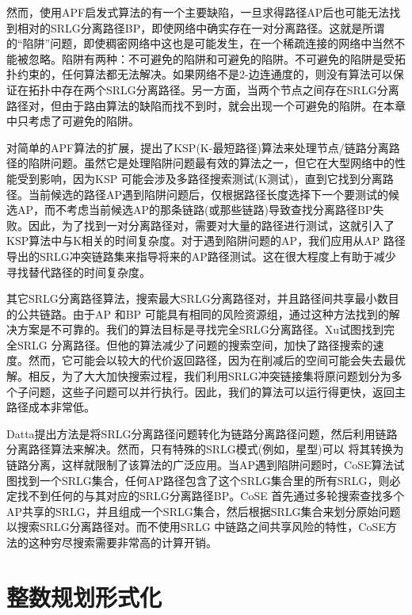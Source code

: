 然而，使用APF启发式算法的有一个主要缺陷，一旦求得路径AP后也可能无法找到相对的SRLG分离路径BP，即使网络中确实存在一对分离路径。这就是所谓的“陷阱”问题，即使稠密网络中\cite{laborczi2001solving}这也是可能发生，在一个稀疏连接的网络中当然不能被忽略。陷阱有两种：不可避免的陷阱和可避免的陷阱。不可避免的陷阱是受拓扑约束的，任何算法都无法解决。如果网络不是2-边连通度的，则没有算法可以保证在拓扑中存在两个SRLG分离路径。另一方面，当两个节点之间存在SRLG分离路径对，但由于路由算法的缺陷而找不到时，就会出现一个可避免的陷阱。在本章中只考虑了可避免的陷阱。

对简单的APF算法的扩展，提出了KSP(K-最短路径)算法来处理节点/链路分离路径的陷阱问题。虽然它是处理陷阱问题最有效的算法之一，但它在大型网络中的性能受到影响，因为KSP 可能会涉及多路径搜索测试(K测试)，直到它找到分离路径。当前候选的路径AP遇到陷阱问题后，仅根据路径长度选择下一个要测试的候选AP，而不考虑当前候选AP的那条链路(或那些链路)导致查找分离路径BP失败。因此，为了找到一对分离路径对，需要对大量的路径进行测试，这就引入了KSP算法中与K相关的时间复杂度。对于遇到陷阱问题的AP，我们应用从AP 路径导出的SRLG冲突链路集来指导将来的AP路径测试。这在很大程度上有助于减少寻找替代路径的时间复杂度。

其它SRLG分离路径算法\cite{rostami2012msdp,rostami2007cose,datta2008graph,xu2003new,todimala2004imsh}，搜索最大SRLG分离路径对，并且路径间共享最小数目的公共链路。由于AP 和BP 可能具有相同的风险资源组，通过这种方法找到的解决方案是不可靠的。我们的算法目标是寻找完全SRLG分离路径。Xu\cite{xu2003trap}试图找到完全SRLG 分离路径。但他的算法减少了问题的搜索空间，加快了路径搜索的速度。然而，它可能会以较大的代价返回路径，因为在削减后的空间可能会失去最优解。相反，为了大大加快搜索过程，我们利用SRLG冲突链接集将原问题划分为多个子问题，这些子问题可以并行执行。因此，我们的算法可以运行得更快，返回主路径成本非常低。

Datta\cite{datta2008graph}提出方法是将SRLG分离路径问题转化为链路分离路径问题，然后利用链路分离路径算法来解决。然而，只有特殊的SRLG模式(例如，星型)可以
将其转换为链路分离，这样就限制了该算法的广泛应用。当AP遇到陷阱问题时，CoSE\cite{rostami2007cose}算法试图找到一个SRLG集合，任何AP路径包含了这个SRLG集合里的所有SRLG，则必定找不到任何的与其对应的SRLG分离路径BP。CoSE 首先通过多轮搜索查找多个AP共享的SRLG，并且组成一个SRLG集合，然后根据SRLG集合来划分原始问题以搜索SRLG分离路径对。而不使用SRLG 中链路之间共享风险的特性，CoSE方法的这种穷尽搜索需要非常高的计算开销。



\section{整数规划形式化}
